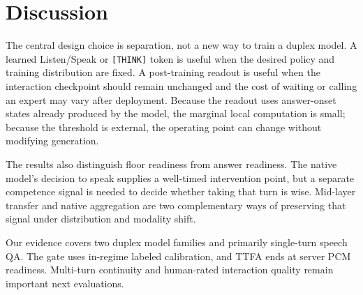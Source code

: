 \section{Discussion}
\label{sec:discussion}
The central design choice is separation, not a new way to train a duplex
model. A learned Listen/Speak or \texttt{[THINK]} token is useful when the
desired policy and training distribution are fixed. A post-training readout is
useful when the interaction checkpoint should remain unchanged and the cost of
waiting or calling an expert may vary after deployment. Because the readout
uses answer-onset states already produced by the model, the marginal local
computation is small; because the threshold is external, the operating point
can change without modifying generation.

The results also distinguish floor readiness from answer readiness. The native
model's decision to speak supplies a well-timed intervention point, but a
separate competence signal is needed to decide whether taking that turn is
wise. Mid-layer transfer and native aggregation are two complementary ways of
preserving that signal under distribution and modality shift.

Our evidence covers two duplex model families and primarily single-turn speech
QA. The gate uses in-regime labeled calibration, and TTFA ends at server PCM
readiness. Multi-turn continuity and human-rated interaction quality remain
important next evaluations.
